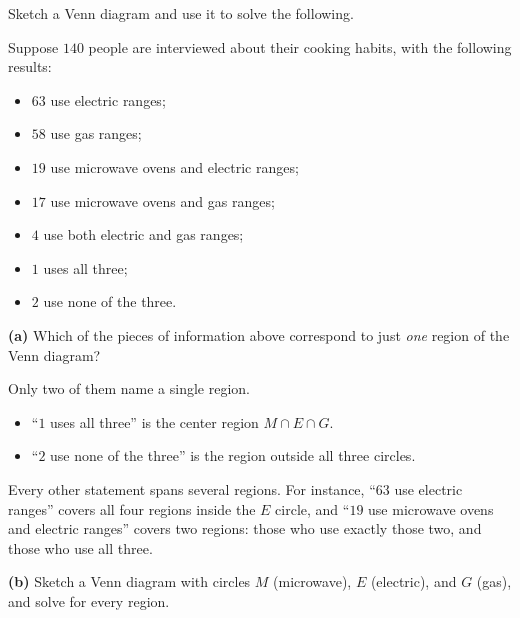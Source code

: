 \documentclass[12pt]{ximera}
\begin{document}
\begin{problem}
Sketch a Venn diagram and use it to solve the following.

Suppose $140$ people are interviewed about their cooking habits, with the following
results:
\begin{itemize}
    \item $63$ use electric ranges;
    \item $58$ use gas ranges;
    \item $19$ use microwave ovens and electric ranges;
    \item $17$ use microwave ovens and gas ranges;
    \item $4$ use both electric and gas ranges;
    \item $1$ uses all three;
    \item $2$ use none of the three.
\end{itemize}

\begin{prompt}
\textbf{(a)} Which of the pieces of information above correspond to just \emph{one}
region of the Venn diagram?

\begin{selectAll}
\end{selectAll}

\begin{feedback}
Only two of them name a single region.
\begin{itemize}
\item ``$1$ uses all three'' is the center region $M\cap E\cap G$.
\item ``$2$ use none of the three'' is the region outside all three circles.
\end{itemize}
Every other statement spans several regions. For instance, ``$63$ use electric
ranges'' covers all four regions inside the $E$ circle, and ``$19$ use microwave
ovens and electric ranges'' covers two regions: those who use exactly those two, and
those who use all three.
\end{feedback}
\end{prompt}

\begin{prompt}
\textbf{(b)} Sketch a Venn diagram with circles $M$ (microwave), $E$ (electric), and $G$
(gas), and solve for every region.


\end{prompt}
\end{problem}
\end{document}
